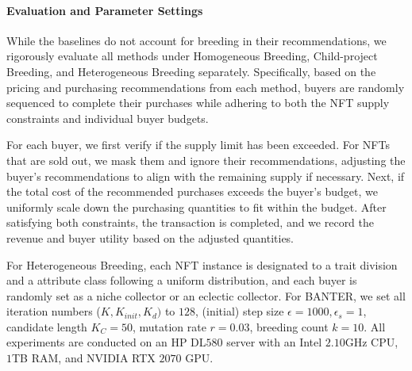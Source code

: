 \documentclass[conference]{IEEEtran}
\theoremstyle{plain}
\begin{document}
{\paragraph{Evaluation and Parameter Settings}
While the baselines do not account for breeding in their recommendations, we rigorously evaluate all methods under Homogeneous Breeding\xspace, Child-project Breeding\xspace, and Heterogeneous Breeding\xspace separately. Specifically, based on the pricing and purchasing recommendations from each method, buyers are randomly sequenced to complete their purchases while adhering to both the NFT supply constraints and individual buyer budgets.

For each buyer, we first verify if the supply limit has been exceeded. For NFTs that are sold out, we mask them and ignore their recommendations, adjusting the buyer’s recommendations to align with the remaining supply if necessary. Next, if the total cost of the recommended purchases exceeds the buyer’s budget, we uniformly scale down the purchasing quantities to fit within the budget. After satisfying both constraints, the transaction is completed, and we record the revenue and buyer utility based on the adjusted quantities.


For Heterogeneous Breeding\xspace, each NFT instance is designated to a trait division and a attribute class following a uniform distribution, and each buyer is randomly set as a niche collector or an eclectic collector. For BANTER\xspace, we set all iteration numbers ($K, K_{init}, K_{d})$ to $128$, (initial) step size $\epsilon=1000, \epsilon_s=1$, candidate length $K_C=50$, mutation rate $r=0.03$, breeding count $k=10$. All experiments are conducted on an HP DL$580$ server with an Intel $2.10$GHz CPU, $1$TB RAM, and NVIDIA RTX $2070$ GPU.
}
\end{document}
